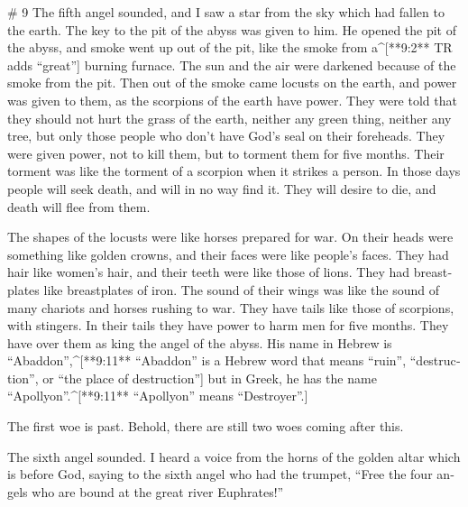 \begin{paracols}{2}
\switchcolumn
\begin{english}

# 9
 The fifth angel sounded, and I saw a star from the sky which had fallen to the earth. The key to the pit of the abyss was given to him.  He opened the pit of the abyss, and smoke went up out of the pit, like the smoke from a^[**9:2** TR adds “great”] burning furnace. The sun and the air were darkened because of the smoke from the pit.  Then out of the smoke came locusts on the earth, and power was given to them, as the scorpions of the earth have power.  They were told that they should not hurt the grass of the earth, neither any green thing, neither any tree, but only those people who don’t have God’s seal on their foreheads.  They were given power, not to kill them, but to torment them for five months. Their torment was like the torment of a scorpion when it strikes a person.  In those days people will seek death, and will in no way find it. They will desire to die, and death will flee from them. 

 The shapes of the locusts were like horses prepared for war. On their heads were something like golden crowns, and their faces were like people’s faces.  They had hair like women’s hair, and their teeth were like those of lions.  They had breastplates like breastplates of iron. The sound of their wings was like the sound of many chariots and horses rushing to war.  They have tails like those of scorpions, with stingers. In their tails they have power to harm men for five months.  They have over them as king the angel of the abyss. His name in Hebrew is “Abaddon”,^[**9:11** “Abaddon” is a Hebrew word that means “ruin”, “destruction”, or “the place of destruction”] but in Greek, he has the name “Apollyon”.^[**9:11** “Apollyon” means “Destroyer”.] 

 The first woe is past. Behold, there are still two woes coming after this. 

 The sixth angel sounded. I heard a voice from the horns of the golden altar which is before God,  saying to the sixth angel who had the trumpet, “Free the four angels who are bound at the great river Euphrates!” 


\end{english}
\end{paracols}
